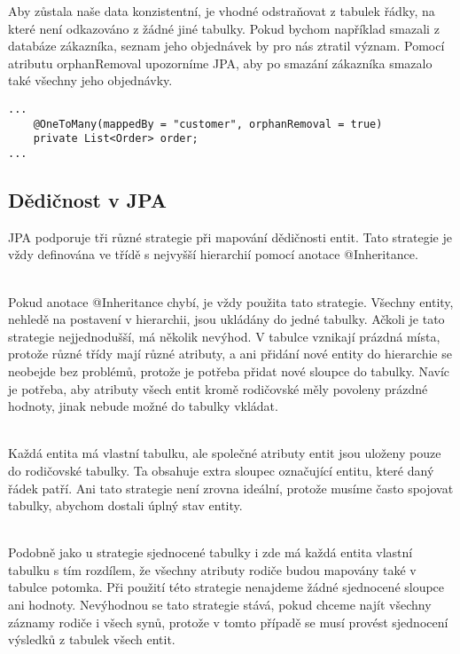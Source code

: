 \documentclass[122pt,oneside]{fithesis}
\begin{document}
Aby zůstala naše data konzistentní, je vhodné odstraňovat z tabulek řádky, na které není odkazováno z žádné jiné tabulky. Pokud bychom například smazali z databáze zákazníka, seznam jeho objednávek by pro nás ztratil význam. Pomocí atributu orphanRemoval upozorníme JPA, aby po smazání zákazníka smazalo také všechny jeho objednávky.
\begin{lstlisting}
...
	@OneToMany(mappedBy = "customer", orphanRemoval = true)
	private List<Order> order;
...
\end{lstlisting}
\subsection{Dědičnost v JPA}
JPA podporuje tři různé strategie při mapování dědičnosti entit. Tato strategie je vždy definována ve třídě s nejvyšší hierarchií pomocí anotace @Inheritance.

\vspace{5 mm}
\\\indent Pokud anotace @Inheritance chybí, je vždy použita tato strategie. Všechny entity, nehledě na postavení v hierarchii, jsou ukládány do jedné tabulky. Ačkoli je tato strategie nejjednodušší, má několik nevýhod. V tabulce vznikají prázdná místa, protože různé třídy mají různé atributy, a ani přidání nové entity do hierarchie se neobejde bez problémů, protože je potřeba přidat nové sloupce do tabulky. Navíc je potřeba, aby atributy všech entit kromě rodičovské měly povoleny prázdné hodnoty, jinak nebude možné do tabulky vkládat.

\vspace{5 mm}
\\\indent Každá entita má vlastní tabulku, ale společné atributy entit jsou uloženy pouze do rodičovské tabulky. Ta obsahuje extra sloupec označující entitu, které daný řádek patří. Ani tato strategie není zrovna ideální, protože musíme často spojovat tabulky, abychom dostali úplný stav entity.

\vspace{5 mm}
\\\indent Podobně jako u strategie sjednocené tabulky i zde má každá entita vlastní tabulku s tím rozdílem, že všechny atributy rodiče budou mapovány také v tabulce potomka. Při použití této strategie nenajdeme žádné sjednocené sloupce ani hodnoty. Nevýhodnou se tato strategie stává, pokud chceme najít všechny záznamy rodiče i všech synů, protože v tomto případě se musí provést sjednocení výsledků z tabulek všech entit.
\end{document}

